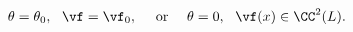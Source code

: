 \begin{equation*}
  \theta=\theta_0,~~\vf=\vf_0,~~~~\text{or}~~~~\theta=0,~~\vf(x)\in\CC^2(L).
\end{equation*}

